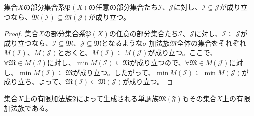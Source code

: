 \documentclass[dvipdfmx]{jsarticle}
\begin{document}
\begin{thm}\label{4.5.6.6}
集合$X$の部分集合系$\mathfrak{P}(X)$の任意の部分集合たち$\mathcal{I}$、$\mathcal{J}$に対し、$\mathcal{I \subseteq J}$が成り立つなら、$\mathfrak{M}\left( \mathcal{I} \right)\subseteq \mathfrak{M}\left( \mathcal{J} \right)$が成り立つ。
\end{thm}
\begin{proof}
集合$X$の部分集合系$\mathfrak{P}(X)$の任意の部分集合たち$\mathcal{I}$、$\mathcal{J}$に対し、$\mathcal{I \subseteq J}$が成り立つなら、$\mathcal{I \subseteq}\mathfrak{M}$、$\mathcal{J \subseteq}\mathfrak{M}$となるような$\sigma$-加法族$\mathfrak{M}$全体の集合をそれぞれ$M\left( \mathcal{I} \right)$、$M\left( \mathcal{J} \right)$とおくと、$M\left( \mathcal{I} \right) \subseteq M\left( \mathcal{J} \right)$が成り立つ。ここで、$\mathfrak{\forall M \in}M\left( \mathcal{I} \right)$に対し、$\min{M\left( \mathcal{I} \right)}\subseteq \mathfrak{M}$が成り立つので、$\mathfrak{\forall M \in}M\left( \mathcal{J} \right)$に対し、$\min{M\left( \mathcal{I} \right)}\subseteq \mathfrak{M}$が成り立つ。したがって、$\min{M\left( \mathcal{I} \right)} \subseteq \min{M\left( \mathcal{J} \right)}$が成り立ち、よって、$\mathfrak{M}\left( \mathcal{I} \right)\subseteq \mathfrak{M}\left( \mathcal{J} \right)$が成り立つ。
\end{proof}
\begin{thm}\label{4.5.6.7}
集合$X$上の有限加法族$\mathfrak{F}$によって生成される単調族$\mathfrak{M}\left( \mathfrak{F} \right)$もその集合$X$上の有限加法族である。
\end{thm}
\end{document}
